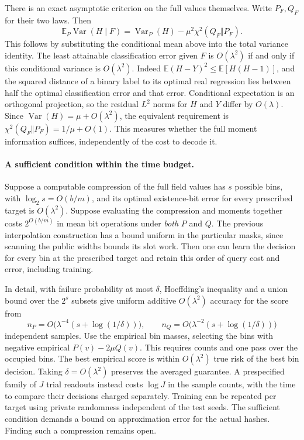\documentclass[11pt]{article}
\newcommand{\E}{\mathbb E}
\begin{document}
There is an exact asymptotic criterion on the full values themselves.
Write $P_F,Q_F$ for their two laws. Then
\[
 \E_P\operatorname{Var}(H\mid F)
   =\operatorname{Var}_P(H)-\mu^2\chi^2(Q_F\Vert P_F).
\]
This follows by substituting the conditional mean above into the total
variance identity. The least attainable classification error given $F$
is $O(\lambda^2)$ if and only if this conditional variance is
$O(\lambda^2)$. Indeed $\E(H-Y)^2\le\E[H(H-1)]$, and the squared
distance of a binary label to its optimal real regression lies between
half the optimal classification error and that error. Conditional
expectation is an orthogonal projection, so the residual $L^2$
norms for $H$ and $Y$ differ by $O(\lambda)$. Since
$\operatorname{Var}(H)=\mu+O(\lambda^2)$, the equivalent requirement is
$\chi^2(Q_F\Vert P_F)=1/\mu+O(1)$. This measures whether the full
moment information suffices, independently of the cost to decode it.

\paragraph{A sufficient condition within the time budget.}
Suppose a computable compression of the full field values has $s$
possible bins, with $\log_2 s=O(b/m)$, and its optimal existence-bit
error for every prescribed target is $O(\lambda^2)$. Suppose evaluating
the compression and moments together costs $2^{O(b/m)}$ in mean bit
operations under \emph{both} $P$ and $Q$. The previous interpolation
construction has a bound uniform in the particular masks, since scanning
the public widths bounds its slot work. Then one can learn the decision
for every bin at the prescribed target and retain this order of query
cost and error, including training.

In detail, with failure probability at most $\delta$, Hoeffding's
inequality and a union bound over the $2^s$ subsets give uniform
additive $O(\lambda^2)$ accuracy for the score from
\[
 n_P=O\bigl(\lambda^{-4}(s+\log(1/\delta))\bigr),\qquad
 n_Q=O\bigl(\lambda^{-2}(s+\log(1/\delta))\bigr)
\]
independent samples. Use the empirical bin masses, selecting the bins
with negative empirical $P(v)-2\mu Q(v)$. This requires counts and one
pass over the occupied bins. The best empirical score is within
$O(\lambda^2)$ true risk of the best bin decision. Taking
$\delta=O(\lambda^2)$ preserves the averaged guarantee. A prespecified
family of $J$ trial readouts instead costs $\log J$ in the sample counts,
with the time to compare their decisions charged separately. Training
can be repeated per target using private randomness independent of the
test seeds. The sufficient condition demands a bound on approximation
error for the actual hashes. Finding such a compression remains open.
\end{document}
